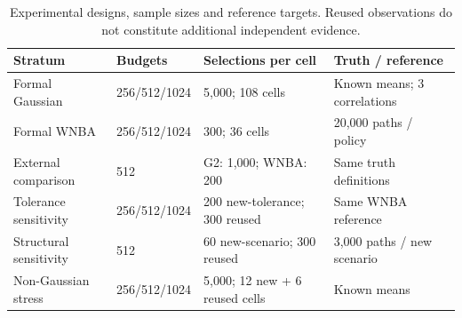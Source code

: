 \begin{table}[tbp]\centering\footnotesize
\caption{Experimental designs, sample sizes and reference targets. Reused observations do not constitute additional independent evidence.}\label{tab:design}
\begin{tabularx}{\linewidth}{XlXX}\toprule
Stratum & Budgets & Selections per cell & Truth / reference \\ \midrule
Formal Gaussian & 256/512/1024 & 5,000; 108 cells & Known means; 3 correlations \\
Formal WNBA & 256/512/1024 & 300; 36 cells & 20,000 paths / policy \\
External comparison & 512 & G2: 1,000; WNBA: 200 & Same truth definitions \\
Tolerance sensitivity & 256/512/1024 & 200 new-tolerance; 300 reused & Same WNBA reference \\
Structural sensitivity & 512 & 60 new-scenario; 300 reused & 3,000 paths / new scenario \\
Non-Gaussian stress & 256/512/1024 & 5,000; 12 new + 6 reused cells & Known means \\
\bottomrule\end{tabularx}
\end{table}
